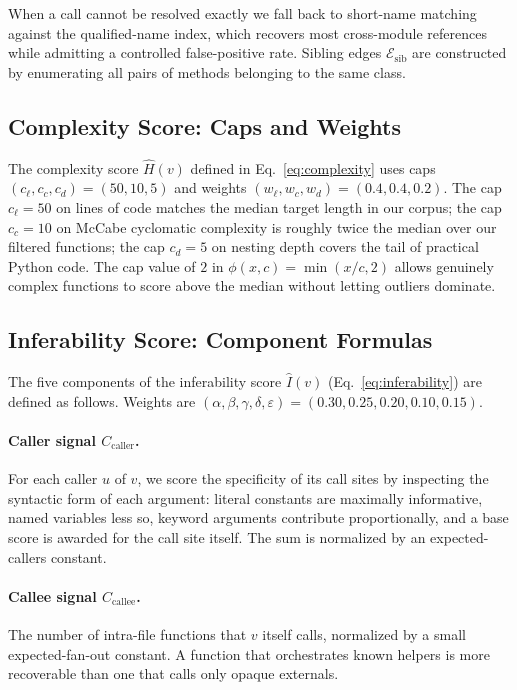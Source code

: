 When a call cannot be resolved exactly we fall back to short-name
matching against the qualified-name index, which recovers most
cross-module references while admitting a controlled false-positive rate.
Sibling edges $\mathcal{E}_{\mathrm{sib}}$ are constructed by enumerating
all pairs of methods belonging to the same class.

\subsection{Complexity Score: Caps and Weights}
\label{app:algo:hyperparams}

The complexity score $\hat{H}(v)$ defined in Eq.~\eqref{eq:complexity}
uses caps $(c_{\ell}, c_{c}, c_{d}) = (50, 10, 5)$ and weights
$(w_{\ell}, w_{c}, w_{d}) = (0.4, 0.4, 0.2)$. The cap $c_{\ell} = 50$
on lines of code matches the median target length in our corpus; the
cap $c_c = 10$ on McCabe cyclomatic complexity is roughly twice the
median over our filtered functions; the cap $c_d = 5$ on nesting depth
covers the tail of practical Python code. The cap value of $2$ in
$\phi(x, c) = \min(x/c, 2)$ allows genuinely complex functions to score
above the median without letting outliers dominate.

\subsection{Inferability Score: Component Formulas}
\label{app:algo:inferability}

The five components of the inferability score
$\hat{I}(v)$ (Eq.~\ref{eq:inferability}) are defined as follows. Weights
are $(\alpha,\beta,\gamma,\delta,\varepsilon) = (0.30, 0.25, 0.20, 0.10, 0.15)$.

\paragraph{Caller signal $C_{\mathrm{caller}}$.}
For each caller $u$ of $v$, we score the specificity of its call sites by
inspecting the syntactic form of each argument: literal constants are
maximally informative, named variables less so, keyword arguments
contribute proportionally, and a base score is awarded for the call site
itself. The sum is normalized by an expected-callers constant.

\paragraph{Callee signal $C_{\mathrm{callee}}$.}
The number of intra-file functions that $v$ itself calls, normalized by a
small expected-fan-out constant. A function that orchestrates known
helpers is more recoverable than one that calls only opaque externals.

